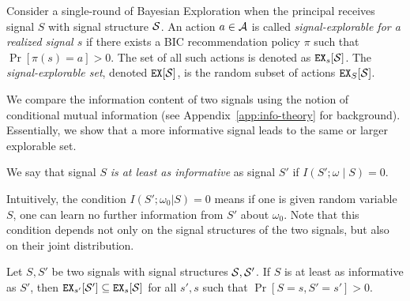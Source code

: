 
\begin{definition}
	Consider a single-round of Bayesian Exploration when the principal receives signal $S$ with signal structure $\S$. An action $a \in \A$ is called {\em signal-explorable for a realized signal $s$} if there exists a BIC recommendation policy $\pi$ such that $\Pr[\pi(s) = a] > 0$. The set of all such actions is denoted as $\EX_s[\S]$. The {\em signal-explorable set}, denoted $\EX[\S]$, is the random subset of actions $\EX_S[\S]$.
\end{definition}



We compare the information content of two signals using the notion of conditional mutual information (see Appendix~\ref{app:info-theory} for background). Essentially, we show that a more informative signal leads to the same or larger explorable set.

\begin{definition}
	We say that signal $S$ \emph{is at least as informative} as signal $S'$ if $I(S' ; \omega\mid S) = 0$.
\end{definition}


Intuitively, the condition $I(S';\omega_0|S)= 0$  means if one is given random variable $S$, one can learn no further information from $S'$ about $\omega_0$. Note that this condition depends not only on the signal structures of the two signals, but also on their joint distribution.

\begin{lemma}
	\label{lem:infomono}
	Let $S,S'$ be two signals with signal structures $\S,\S'$. If $S$ is at least as informative as $S'$, then $\EX_{s'}[\S'] \subseteq \EX_s[\S]$ for all $s' ,s$ such that $\Pr[S= s, S'= s'] > 0$.
\end{lemma}

